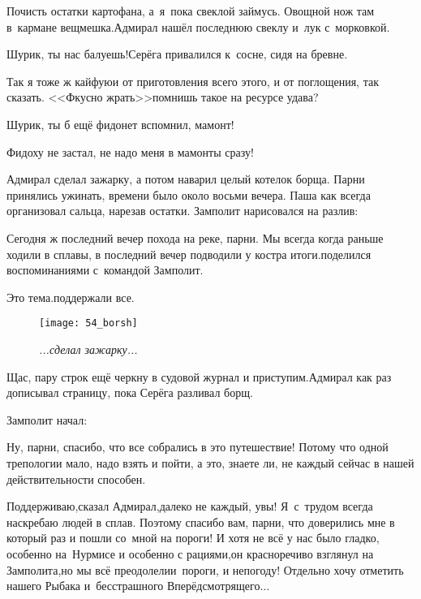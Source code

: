 \diagdash Почисть остатки картофана, а~я~пока свеклой займусь. Овощной нож там в~кармане вещмешка.\mdash Адмирал нашёл последнюю свеклу и~лук с~морковкой.

\diagdash Шурик, ты нас балуешь!\mdash Серёга привалился к~сосне, сидя на бревне.

\diagdash Так я тоже ж кайфую\mdash и от приготовления всего этого, и от поглощения, так сказать. <<Фкусно жрать>>\mdash помнишь такое на ресурсе удава?

\diagdash Шурик, ты б ещё фидонет вспомнил, мамонт!

\diagdash Фидоху не застал, не надо меня в мамонты сразу!

Адмирал сделал зажарку, а потом наварил целый котелок борща. Парни принялись ужинать, времени было около восьми вечера. Паша как всегда организовал сальца, нарезав остатки. Замполит нарисовался на разлив:

\diagdash Сегодня ж последний вечер похода на реке, парни. Мы всегда когда раньше ходили в сплавы, в последний вечер подводили у костра итоги.\mdash поделился воспоминаниями с~командой Замполит.

\diagdash Это тема.\mdash поддержали все.

\begin{wrapfigure}[18]{l}{0.50\textwidth}
	\centering
	\texttt{[image: 54\_borsh]}
	\caption{\small\textit{...сделал зажарку...}}
\end{wrapfigure}
\mdash Щас, пару строк ещё черкну в судовой журнал и приступим.\mdash Адмирал как раз дописывал страницу, пока Серёга разливал борщ.

Замполит начал:

\diagdash Ну, парни, спасибо, что все собрались в это путешествие! Потому что одной трепологии мало, надо взять и пойти, а это, знаете ли, не каждый сейчас в нашей действительности способен. %

\diagdash Поддерживаю,\mdash сказал Адмирал,\mdash далеко не каждый, увы! Я~с~трудом всегда наскребаю людей в сплав. Поэтому спасибо вам, парни, что доверились мне в который раз и пошли со~мной на пороги! И хотя не всё у нас было гладко, особенно на~Нурмисе и особенно с рациями,\mdash он красноречиво взглянул на Замполита,\mdash но мы всё преодолели\mdash и~пороги, и непогоду! Отдельно хочу отметить нашего Рыбака и~бесстрашного Вперёдсмотрящего$\ldots$

